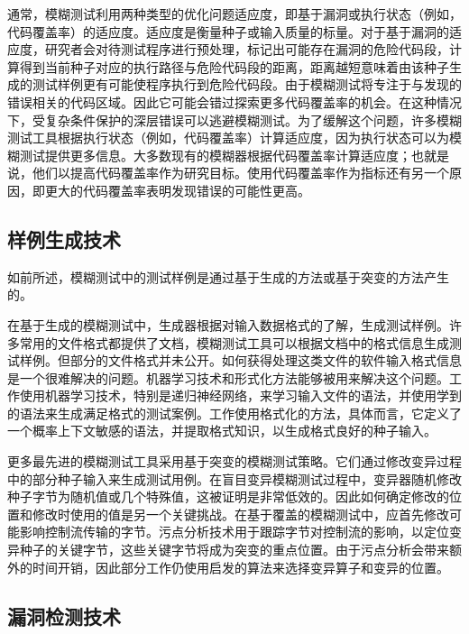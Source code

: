 \documentclass[master]{thesis-uestc}
\begin{document}
通常，模糊测试利用两种类型的优化问题适应度，即基于漏洞或执行状态（例如，代码覆盖率）的适应度。适应度是衡量种子或输入质量的标量。对于基于漏洞的适应度，研究者会对待测试程序进行预处理，标记出可能存在漏洞的危险代码段，计算得到当前种子对应的执行路径与危险代码段的距离，距离越短意味着由该种子生成的测试样例更有可能使程序执行到危险代码段。由于模糊测试将专注于与发现的错误相关的代码区域。因此它可能会错过探索更多代码覆盖率的机会。在这种情况下，受复杂条件保护的深层错误可以逃避模糊测试。为了缓解这个问题，许多模糊测试工具根据执行状态（例如，代码覆盖率）计算适应度，因为执行状态可以为模糊测试提供更多信息。大多数现有的模糊器根据代码覆盖率计算适应度；也就是说，他们以提高代码覆盖率作为研究目标。使用代码覆盖率作为指标还有另一个原因，即更大的代码覆盖率表明发现错误的可能性更高。

\subsection{样例生成技术}

如前所述，模糊测试中的测试样例是通过基于生成的方法或基于突变的方法产生的。

在基于生成的模糊测试中，生成器根据对输入数据格式的了解，生成测试样例。许多常用的文件格式都提供了文档，模糊测试工具可以根据文档中的格式信息生成测试样例。但部分的文件格式并未公开。如何获得处理这类文件的软件输入格式信息是一个很难解决的问题。机器学习技术和形式化方法能够被用来解决这个问题。工作使用机器学习技术，特别是递归神经网络，来学习输入文件的语法，并使用学到的语法来生成满足格式的测试案例。工作使用格式化的方法，具体而言，它定义了一个概率上下文敏感的语法，并提取格式知识，以生成格式良好的种子输入。

更多最先进的模糊测试工具采用基于突变的模糊测试策略。它们通过修改变异过程中的部分种子输入来生成测试用例。在盲目变异模糊测试过程中，变异器随机修改种子字节为随机值或几个特殊值，这被证明是非常低效的。因此如何确定修改的位置和修改时使用的值是另一个关键挑战。在基于覆盖的模糊测试中，应首先修改可能影响控制流传输的字节。污点分析技术用于跟踪字节对控制流的影响，以定位变异种子的关键字节，这些关键字节将成为突变的重点位置。由于污点分析会带来额外的时间开销，因此部分工作仍使用启发的算法来选择变异算子和变异的位置。

\subsection{漏洞检测技术}
\end{document}
